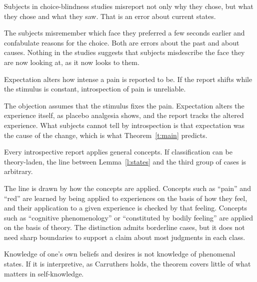 \documentclass{situationist-preprint}
\begin{document}
\begin{objection}\label{o:choice}
Subjects in choice-blindness studies misreport not only why they chose, but what they chose and what they saw. That is an error about current states.
\end{objection}

\begin{reply}
The subjects misremember which face they preferred a few seconds earlier and confabulate reasons for the choice. Both are errors about the past and about causes. Nothing in the studies suggests that subjects misdescribe the face they are now looking at, as it now looks to them.
\end{reply}

\begin{objection}\label{o:pain}
Expectation alters how intense a pain is reported to be. If the report shifts while the stimulus is constant, introspection of pain is unreliable.
\end{objection}

\begin{reply}
The objection assumes that the stimulus fixes the pain. Expectation alters the experience itself, as placebo analgesia shows, and the report tracks the altered experience. What subjects cannot tell by introspection is that expectation was the cause of the change, which is what Theorem~\ref{t:main} predicts.
\end{reply}

\begin{objection}\label{o:class}
Every introspective report applies general concepts. If classification can be theory-laden, the line between Lemma~\ref{l:states} and the third group of cases is arbitrary.
\end{objection}

\begin{reply}
The line is drawn by how the concepts are applied. Concepts such as \enquote{pain} and \enquote{red} are learned by being applied to experiences on the basis of how they feel, and their application to a given experience is checked by that feeling. Concepts such as \enquote{cognitive phenomenology} or \enquote{constituted by bodily feeling} are applied on the basis of theory. The distinction admits borderline cases, but it does not need sharp boundaries to support a claim about most judgments in each class.
\end{reply}

\begin{objection}[Attitudes]\label{o:attitudes}
Knowledge of one's own beliefs and desires is not knowledge of phenomenal states. If it is interpretive, as Carruthers holds, the theorem covers little of what matters in self-knowledge.
\end{objection}
\end{document}
